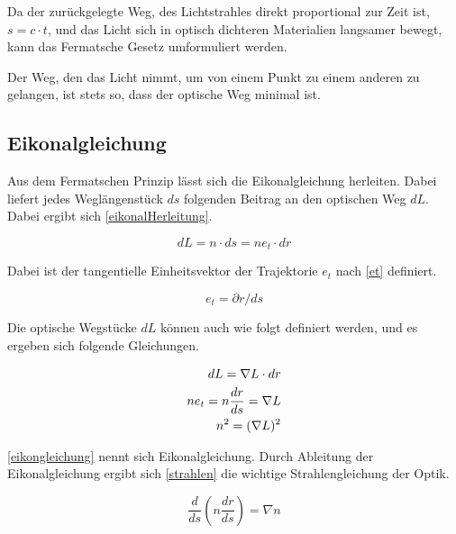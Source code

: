 Da der zurückgelegte Weg, des Lichtstrahles direkt proportional zur Zeit ist, $s = c \cdot t$,
und das Licht sich in optisch dichteren Materialien langsamer bewegt,
kann das Fermatsche Gesetz umformuliert werden\cite{Definition}. 


\begin{definition}
Der Weg, den das Licht nimmt, 
um von einem Punkt zu einem anderen zu gelangen, 
ist stets so, dass der optische Weg minimal ist.
\end{definition}

\subsection{Eikonalgleichung}
Aus dem Fermatschen Prinzip lässt sich die Eikonalgleichung herleiten.
Dabei liefert jedes Weglängenstück $ds$ folgenden Beitrag an den optischen Weg $dL$. 
Dabei ergibt sich \eqref{eikonalHerleitung}.

\begin{equation}
	dL = n \cdot ds = n e_t \cdot dr
	\label{eikonalHerleitung}
\end{equation}

Dabei ist der tangentielle Einheitsvektor der Trajektorie $e_t$ nach  \eqref{et} definiert.

\begin{equation}
	e_t = \partial r / ds
	\label{et}
\end{equation}

Die optische Wegstücke $dL$ können auch wie folgt  definiert werden, 
und es ergeben sich folgende Gleichungen.

\begin{align}
	dL = \nabla L \cdot dr \notag \\
	n e_t = n \frac{dr}{ds} = \nabla L \notag \\
	n^2 = (\nabla L)^2 \label{eikongleichung}
\end{align}

\eqref{eikongleichung} nennt sich Eikonalgleichung.
Durch Ableitung der Eikonalgleichung ergibt sich \eqref{strahlen} die wichtige Strahlengleichung der Optik.

\begin{equation}
	\frac{d}{ds} \left ( n \frac{dr}{ds} \right ) = \nabla n
	\label{strahlen}
\end{equation}

